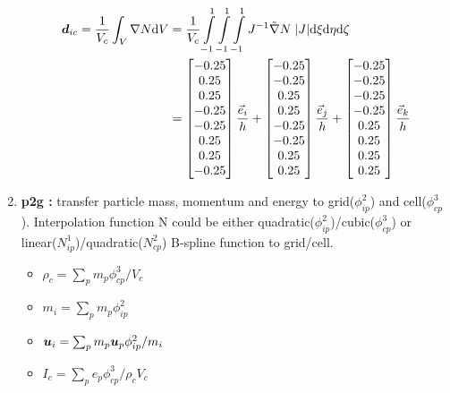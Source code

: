 \documentclass[11pt]{article}
\def\bbf#1{\mathchoice{\hbox{\boldmath$\displaystyle#1$}}
{\hbox{\boldmath$\textstyle#1$}} {\hbox{\boldmath$\scriptstyle#1$}} {\hbox{\boldmath$\scriptscriptstyle#1$}} }
\renewcommand{\mp}{m_{p}}
\newcommand{\pcp}{\phi_{cp}^3}
\newcommand{\pip}{\phi_{ip}^2}
\newcommand{\ui}{\bbf{u}_i}
\newcommand{\up}{\bbf{u}_p}
\newcommand{\ep}{e_p}
\newcommand{\mi}{m_i}
\renewcommand{\mp}{m_p}
\newcommand{\rhoc}{\rho_c}
\newcommand{\Vc}{V_c}
\newcommand{\ic}{I_c}
\newcommand{\dic}{\bbf{d}_{ic}}
\newcommand{\md}{\mbox{d}}
\newcommand{\Int}{\int\limits}
\begin{document}
\begin{enumerate}
    \begin{align*}
    \dic = \frac{1}{\Vc}\int_V \nabla N \md V
    &= \frac{1}{\Vc} \Int_{-1}^{1}\Int_{-1}^{1}\Int_{-1}^{1} J^{-1} \tilde{\nabla} N\;  |J|\md \xi \md \eta \md \zeta \\
    &= \left[
    \begin{array}{@{}c@{}}
    -0.25 \\
    0.25 \\
    0.25 \\
    -0.25 \\
    -0.25 \\
    0.25 \\
    0.25 \\
    -0.25
    \end{array}
    \right] \frac{\vec e_i}{h}
    +\left[
    \begin{array}{@{}c@{}}
    -0.25 \\
    -0.25 \\
    0.25 \\
    0.25 \\
    -0.25 \\
    -0.25 \\
    0.25 \\
    0.25
    \end{array}
    \right] \frac{\vec e_j}{h}
    +\left[
    \begin{array}{@{}c@{}}
    -0.25 \\
    -0.25 \\
    -0.25 \\
    -0.25 \\
    0.25 \\
    0.25 \\
    0.25 \\
    0.25
    \end{array}
    \right] \frac{\vec e_k}{h}
    \end{align*}




\item {\bf p2g :} transfer particle mass, momentum and energy to grid($\pip$) and cell($\pcp$). Interpolation function N could be either quadratic($\pip$)/cubic($\pcp$) or linear($N_{ip}^1$)/quadratic($N_{cp}^2$) B-spline function to grid/cell.
\begin{itemize}
    \item $\rhoc = \sum_p \mp \pcp / \Vc$
    \item $\mi = \sum_p \mp \pip$
    \item $\ui = \sum_p \mp \up \pip / \mi$
    \item $\ic = \sum_p \ep \pcp / \rhoc \Vc$
\end{itemize}


\end{enumerate}
\end{document}
